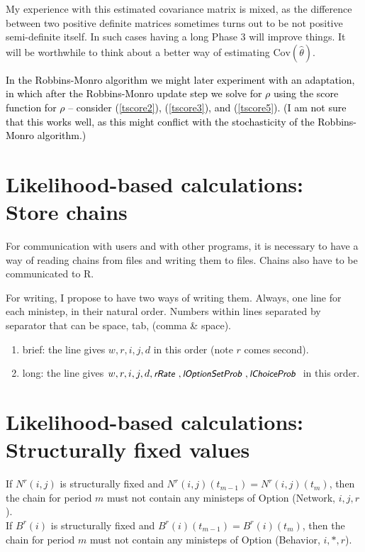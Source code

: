 \documentclass[a4paper,12pt,fleqn]{article}
\newcommand{\Cov}{\mbox{Cov}}
\newcommand{\nnm}[1]{\textsf{\small\textit{#1}\ }}
\newcommand{\addce}[1]{{\textcolor[named]{Black}{#1}}}
\begin{document}
My experience with this estimated covariance matrix is mixed,
as the difference between two positive definite matrices sometimes
turns out to be not positive semi-definite itself.
In such cases having a long Phase 3 will improve things.
It will be worthwhile to think about a better way of
estimating $\Cov(\hat\theta)$.

\addce{
In the Robbins-Monro algorithm we might later experiment with an adaptation,
in which after the Robbins-Monro update step we
solve for $\rho$ using
the score function for $\rho$  --
consider (\ref{tscore2}), (\ref{tscore3}), and (\ref{tscore5}).
(I am not sure that this works well, as this
might conflict with the stochasticity of the Robbins-Monro algorithm.)
}

\section{Likelihood-based calculations:
         \protect\newline Store chains}
\label{S_store}

For communication with users and with other programs,
it is necessary to have a way of reading chains from files
and writing them to files.
Chains also have to be communicated to R.

For writing, I propose to have two ways of writing them.
Always, one line for each ministep, in their natural order.
Numbers within lines separated by separator that can be space, tab, (comma \& space).
\begin{enumerate}
\item brief: the line gives $w, r, i, j, d$ in this order (note $r$ comes second).
\item long: the line gives $w, r, i, j, d, \nnm{rRate}, \nnm{lOptionSetProb},
             \nnm{lChoiceProb} $ in this order.
\end{enumerate}

\section{Likelihood-based calculations:
         \protect\newline Structurally fixed values}
\label{S_struct}

If $N^{r}(i,j)$ is structurally fixed and $N^{r}(i,j)(t_{m-1}) = N^{r}(i,j)(t_m)$,
then the chain for period $m$ must not contain any ministeps of Option (Network, $i,j,r$).\\
If $B^{r}(i)$ is structurally fixed and $B^{r}(i)(t_{m-1}) = B^{r}(i)(t_m)$,
then the chain for period $m$ must not contain any ministeps of Option (Behavior, $i,*, r$).
\end{document}
